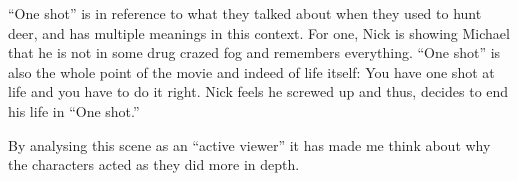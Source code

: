 \documentclass[notitlepage]{fhnwreport}
\begin{document}
``One shot'' is in reference to what they talked about when they used  to hunt
deer, and  has  multiple  meanings  in  this context. For one, Nick is showing
Michael that he is not in some drug crazed fog and remembers everything. ``One
shot'' is also the whole point of the  movie  and  indeed  of life itself: You
have one shot at  life  and  you have to do it right. Nick feels he screwed up
and thus, decides to end his life in ``One shot.''

By analysing this scene as an ``active viewer'' it has made me think about why
the characters acted as they did more in depth.

\printbibliography
\end{document}
